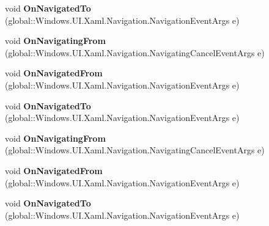 \begin{DoxyCompactItemize}
void {\bfseries On\+Navigated\+To} (global\+::\+Windows.\+U\+I.\+Xaml.\+Navigation.\+Navigation\+Event\+Args e)
\item 
\mbox{\label{interface_windows_1_1_u_i_1_1_xaml_1_1_controls_1_1_i_page_overrides_aa9a09a623757d484b26c44e93160e131}} 
void {\bfseries On\+Navigating\+From} (global\+::\+Windows.\+U\+I.\+Xaml.\+Navigation.\+Navigating\+Cancel\+Event\+Args e)
\item 
\mbox{\label{interface_windows_1_1_u_i_1_1_xaml_1_1_controls_1_1_i_page_overrides_af0d15cae1c922566df43dad9237d536c}} 
void {\bfseries On\+Navigated\+From} (global\+::\+Windows.\+U\+I.\+Xaml.\+Navigation.\+Navigation\+Event\+Args e)
\item 
\mbox{\label{interface_windows_1_1_u_i_1_1_xaml_1_1_controls_1_1_i_page_overrides_a1b9b037b805024dc22a6292f5fac582e}} 
void {\bfseries On\+Navigated\+To} (global\+::\+Windows.\+U\+I.\+Xaml.\+Navigation.\+Navigation\+Event\+Args e)
\item 
\mbox{\label{interface_windows_1_1_u_i_1_1_xaml_1_1_controls_1_1_i_page_overrides_aa9a09a623757d484b26c44e93160e131}} 
void {\bfseries On\+Navigating\+From} (global\+::\+Windows.\+U\+I.\+Xaml.\+Navigation.\+Navigating\+Cancel\+Event\+Args e)
\item 
\mbox{\label{interface_windows_1_1_u_i_1_1_xaml_1_1_controls_1_1_i_page_overrides_af0d15cae1c922566df43dad9237d536c}} 
void {\bfseries On\+Navigated\+From} (global\+::\+Windows.\+U\+I.\+Xaml.\+Navigation.\+Navigation\+Event\+Args e)
\item 
\mbox{\label{interface_windows_1_1_u_i_1_1_xaml_1_1_controls_1_1_i_page_overrides_a1b9b037b805024dc22a6292f5fac582e}} 
void {\bfseries On\+Navigated\+To} (global\+::\+Windows.\+U\+I.\+Xaml.\+Navigation.\+Navigation\+Event\+Args e)
\item 
\mbox{\label{interface_windows_1_1_u_i_1_1_xaml_1_1_controls_1_1_i_page_overrides_aa9a09a623757d484b26c44e93160e131}} 

\end{DoxyCompactItemize}
